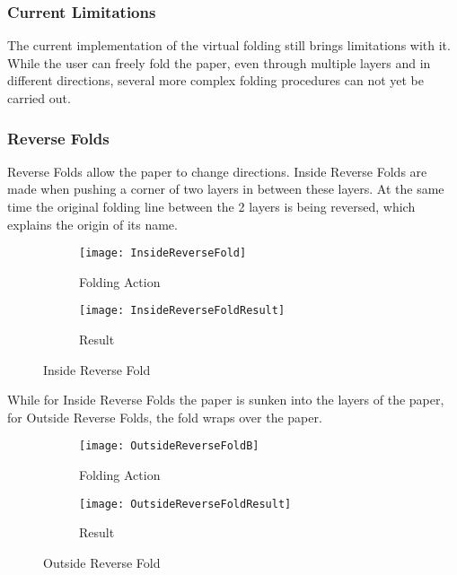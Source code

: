 
\newpage
\subsubsection{Current Limitations}
\label{sec:virtualFoldingLimits}

The current implementation of the virtual folding still brings limitations with it. While the user can freely fold the paper, even through multiple layers and in different directions, several more complex folding procedures can not yet be carried out.

\subsubsection*{Reverse Folds}

Reverse Folds allow the paper to change directions. Inside Reverse Folds are made when pushing a corner of two layers in between these layers. At the same time the original folding line between the 2 layers is being reversed, which explains the origin of its name.
\begin{figure*}[htbp]
	\centering
	\begin{subfigure}{0.4\textwidth}
		\texttt{[image: InsideReverseFold]}
		\caption{Folding Action}
		\label{fig:insideReverseFoldA}
	\end{subfigure}
	\begin{subfigure}{0.4\textwidth}
		\texttt{[image: InsideReverseFoldResult]}
		\caption{Result}
		\label{fig:insideReverseFoldResult}
	\end{subfigure}
	\caption{Inside Reverse Fold}
	\label{fig:insideReverseFold}
\end{figure*}


\noindent While for Inside Reverse Folds the paper is sunken into the layers of the paper, for Outside Reverse Folds, the fold wraps over the paper.
\begin{figure*}[htbp]
	\centering
	\begin{subfigure}{0.3\textwidth}
		\texttt{[image: OutsideReverseFoldB]}
		\caption{Folding Action}
		\label{fig:outsideReverseFoldB}
	\end{subfigure}
	\begin{subfigure}{0.3\textwidth}
		\texttt{[image: OutsideReverseFoldResult]}
		\caption{Result}
		\label{fig:outsideReverseFoldResult}
	\end{subfigure}
	\caption{Outside Reverse Fold}
	\label{fig:outsideReverseFold}
\end{figure*}

